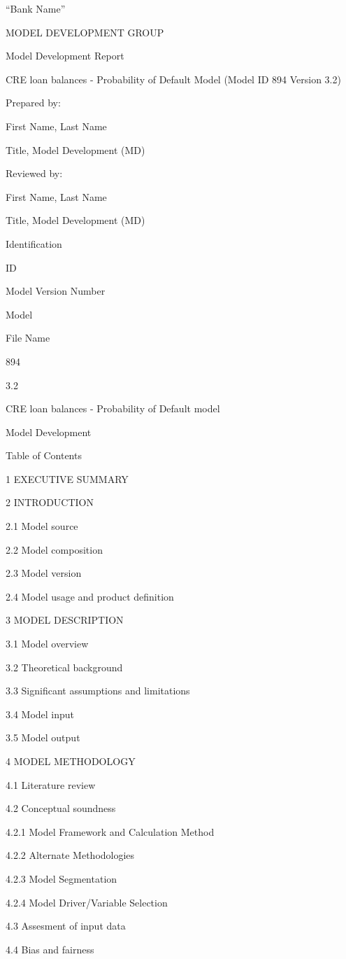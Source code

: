 ``Bank Name''

MODEL DEVELOPMENT GROUP

Model Development Report

CRE loan balances - Probability of Default Model (Model ID 894 Version
3.2)

Prepared by:

First Name, Last Name

Title, Model Development (MD)

Reviewed by:

First Name, Last Name

Title, Model Development (MD)

Identification

ID

Model Version Number

Model

File Name

894

3.2

CRE loan balances - Probability of Default model

Model Development

Table of Contents

1 EXECUTIVE SUMMARY

2 INTRODUCTION

2.1 Model source

2.2 Model composition

2.3 Model version

2.4 Model usage and product definition

3 MODEL DESCRIPTION

3.1 Model overview

3.2 Theoretical background

3.3 Significant assumptions and limitations

3.4 Model input

3.5 Model output

4 MODEL METHODOLOGY

4.1 Literature review

4.2 Conceptual soundness

4.2.1 Model Framework and Calculation Method

4.2.2 Alternate Methodologies

4.2.3 Model Segmentation

4.2.4 Model Driver/Variable Selection

4.3 Assesment of input data

4.4 Bias and fairness

